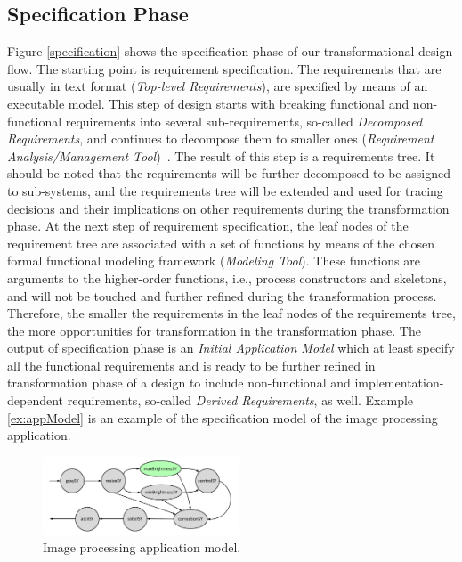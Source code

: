 \subsection{Specification Phase}
Figure \ref{specification} shows the specification phase of our transformational design flow. The starting point is requirement specification. The requirements that are usually in text format (\textit{Top-level Requirements}), are specified by means of an executable model. This step of design starts with breaking functional and non-functional requirements into several sub-requirements, so-called \textit{Decomposed Requirements}, and continues to  decompose them to smaller ones (\textit{Requirement Analysis/Management Tool})~\cite{grady2010system}. The result of this step is a requirements tree. It should be noted that the requirements will be further decomposed to be assigned to sub-systems, and the requirements tree will be extended and used for tracing decisions and their implications on other requirements during the transformation phase. At the next step of requirement specification, the leaf nodes of the requirement tree are associated with a set of functions by means of the chosen formal functional modeling framework (\textit{Modeling Tool}). These functions are arguments to the higher-order functions, i.e., process constructors and skeletons, and will not be touched and further refined during the transformation process. Therefore, the smaller the requirements in the leaf nodes of the requirements tree, the more opportunities for transformation in the transformation phase. The output of specification phase is an \textit{Initial Application Model} which at least specify all the functional requirements and is ready to be further refined in transformation phase of a design to include non-functional and implementation-dependent requirements, so-called \textit{Derived Requirements}, as well. Example \ref{ex:appModel} is an example of the specification model of the image processing application. 

\begin{figure}[t]
	\centering
	\includegraphics[width=2.3in]{figs-src/appModel.pdf}
	\caption{Image processing application model.}
	\label{appModel}
\end{figure}

